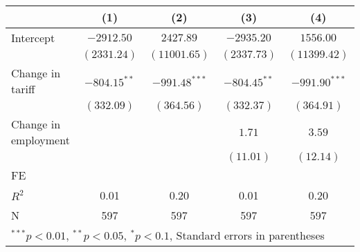 
\begin{tabular}{l c c c c }
\hline
 & (1) & (2) & (3) & (4) \\
\hline
Intercept & $-2912.50$     & $2427.89$       & $-2935.20$     & $1556.00$       \\
            & $(2331.24)$    & $(11001.65)$    & $(2337.73)$    & $(11399.42)$    \\
Change in tariff     & $-804.15^{**}$ & $-991.48^{***}$ & $-804.45^{**}$ & $-991.90^{***}$ \\
            & $(332.09)$     & $(364.56)$      & $(332.37)$     & $(364.91)$      \\
Change in employment     &                &                 & $1.71$         & $3.59$          \\
            &                &                 & $(11.01)$      & $(12.14)$       \\
\hline
FE          &                &                &                &                \\ 
\hline
$R^2$       & 0.01           & 0.20            & 0.01           & 0.20            \\
N           & 597            & 597             & 597            & 597             \\
\hline
\multicolumn{5}{l}{\scriptsize{$^{***}p<0.01$, $^{**}p<0.05$, $^*p<0.1$, Standard errors in parentheses}}
\end{tabular}
